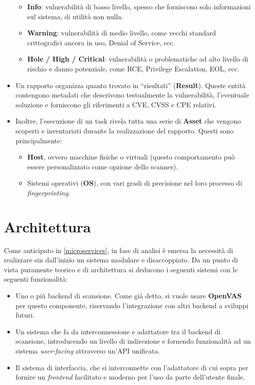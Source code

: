 \begin{itemize}
\begin{itemize}
        \item \textbf{Info}: vulnerabilità di basso livello, spesso che forniscono solo informazioni sul sistema, di utilità non nulla.
        \item \textbf{Warning}: vulnerabilità di medio livello, come vecchi standard crittografici ancora in uso, Denial of Service, ecc.
        \item \textbf{Hole / High / Critical}: vulnerabilità o problematiche ad alto livello di rischio e danno potenziale, come RCE, Privilege Escalation, EOL, ecc.
    \end{itemize}
    \item Un rapporto organizza quanto trovato in ``risultati'' (\textbf{Result}). Queste entità contengono metadati che descrivono testualmente la vulnerabilità, l'eventuale soluzione e forniscono gli riferimenti a CVE, CVSS e CPE relativi.
    \item Inoltre, l'esecuzione di un task rivela tutta una serie di \textbf{Asset} che vengono scoperti e inventariati durante la realizzazione del rapporto. Questi sono principalmente:
    \begin{itemize}
        \item \textbf{Host}, ovvero macchine fisiche o virtuali (questo comportamento può essere personalizzato come opzione dello scanner).
        \item Sistemi operativi (\textbf{OS}), con vari gradi di precisione nel loro processo di \emph{fingerprinting}.
    \end{itemize}
\end{itemize}

\section{Architettura}
Come anticipato in \ref{microservices}, in fase di analisi è emersa la necessità di realizzare sin dall'inizio un sistema modulare e disaccoppiato. Da un punto di vista puramente teorico e di architettura si deducono i seguenti sistemi con le seguenti funzionalità:
\begin{itemize}
    \item Uno o più backend di scansione. Come già detto, si vuole usare \textbf{OpenVAS} per questo componente, riservando l'integrazione con altri backend a sviluppi futuri.
    \item Un sistema che fa da interconnessione e adattatore tra il backend di scansione, introducendo un livello di indirezione e fornendo funzionalità ad un sistema \emph{user-facing} attraverso un'API unificata.
    \item Il sistema di interfaccia, che si interconnette con l'adattatore di cui sopra per fornire un \emph{frontend} facilitato e moderno per l'uso da parte dell'utente finale.
\end{itemize}

